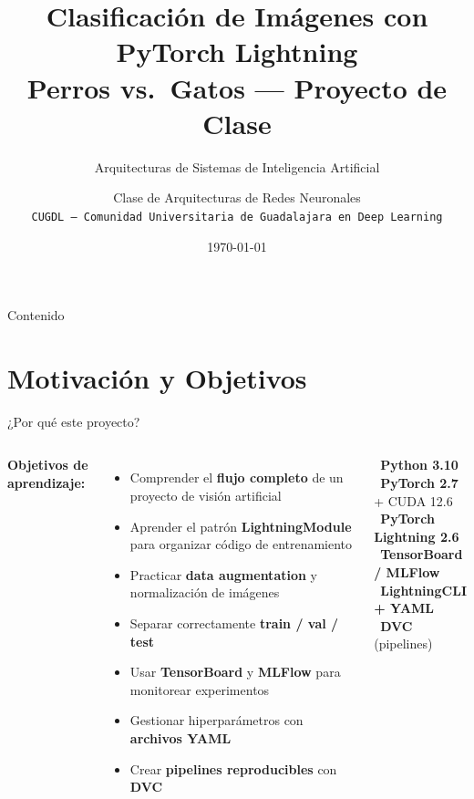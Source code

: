 \documentclass[aspectratio=169,10pt]{beamer}
\title[Clasificación con PyTorch Lightning]{%
    \textbf{Clasificación de Imágenes con PyTorch Lightning}\\
    \large Perros vs.\ Gatos --- Proyecto de Clase}
\subtitle{Arquitecturas de Sistemas de Inteligencia Artificial}
\author[CUGDL]{\faChalkboardTeacher\quad Clase de Arquitecturas de Redes Neuronales\\[4pt]
    \small \texttt{CUGDL --- Comunidad Universitaria de Guadalajara en Deep Learning}}
\date{\today}
\newcommand{\faIcon}[1]{\textbullet}
\begin{document}

\begin{frame}[plain]
    \titlepage
\end{frame}

\begin{frame}{Contenido}
    \tableofcontents
\end{frame}

\section{Motivación y Objetivos}

\begin{frame}{¿Por qué este proyecto?}
    \begin{columns}
        \textbf{Objetivos de aprendizaje:}
        \begin{itemize}
            \item Comprender el \textbf{flujo completo} de un proyecto de visión artificial
            \item Aprender el patrón \textbf{LightningModule} para organizar código de entrenamiento
            \item Practicar \textbf{data augmentation} y normalización de imágenes
            \item Separar correctamente \textbf{train / val / test}
            \item Usar \textbf{TensorBoard} y \textbf{MLFlow} para monitorear experimentos
            \item Gestionar hiperparámetros con \textbf{archivos YAML}
            \item Crear \textbf{pipelines reproducibles} con \textbf{DVC}
        \end{itemize}

        \begin{tcolorbox}[colback=pyblue!10, colframe=pyblue, title=Stack tecnológico]
            \small
            \faIcon{python}\ \textbf{Python 3.10}\\[4pt]
            \faIcon{fire}\ \textbf{PyTorch 2.7} + CUDA 12.6\\[4pt]
            \faIcon{bolt}\ \textbf{PyTorch Lightning 2.6}\\[4pt]
            \faIcon{chart-line}\ \textbf{TensorBoard / MLFlow}\\[4pt]
            \faIcon{sliders}\ \textbf{LightningCLI + YAML}\\[4pt]
            \faIcon{code-branch}\ \textbf{DVC} (pipelines)
        \end{tcolorbox}
    \end{columns}
\end{frame}
\end{document}
